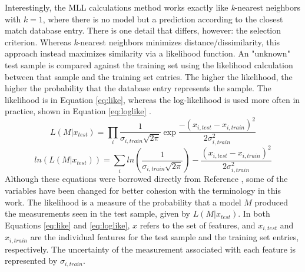 Interestingly, the \gls{MLL} calculations method works exactly like
\textit{k}-nearest neighbors with $k=1$, where there is no model but a
prediction according to the closest match database entry.  There is one detail
that differs, however: the selection criterion.  Whereas \textit{k}-nearest
neighbors minimizes distance/dissimilarity, this approach instead maximizes
similarity via a likelihood function. An "unknown" test sample is compared
against the training set using the likelihood calculation between that sample
and the training set entries.  The higher the likelihood, the higher the
probability that the database entry represents the sample. The likelihood is in
Equation \ref{eq:like}, whereas the log-likelihood is used more often in
practice, shown in Equation \ref{eq:loglike} \cite{mll_method}.
\begin{equation}
  L(M|x_{test}) = \prod_i \frac{1}{\sigma_{i,train} \sqrt{2\pi}} \exp{\frac{-(x_{i,test} - x_{i,train})^2}{2 \sigma_{i,train}^2}}
  \label{eq:like}
\end{equation}
\begin{equation}
  ln(L(M|x_{test})) = \sum_i ln(\frac{1}{\sigma_{i,train} \sqrt{2\pi}}) - \frac{(x_{i,test} - x_{i,train})^2}{2 \sigma_{i,train}^2}
  \label{eq:loglike}
\end{equation}
Although these equations were borrowed directly from Reference
\cite{mll_method}, some of the variables have been changed for better cohesion
with the terminology in this work.  The likelihood is a measure of the
probability that a model $M$ produced the measurements seen in the test sample,
given by $L(M|x_{test})$.  In both Equations \ref{eq:like} and
\ref{eq:loglike}, $x$ refers to the set of features, and $x_{i, test}$ and
$x_{i,train}$ are the individual features for the test sample and the training
set entries, respectively. The uncertainty of the measurement associated with
each feature is represented by $\sigma_{i,train}$.

